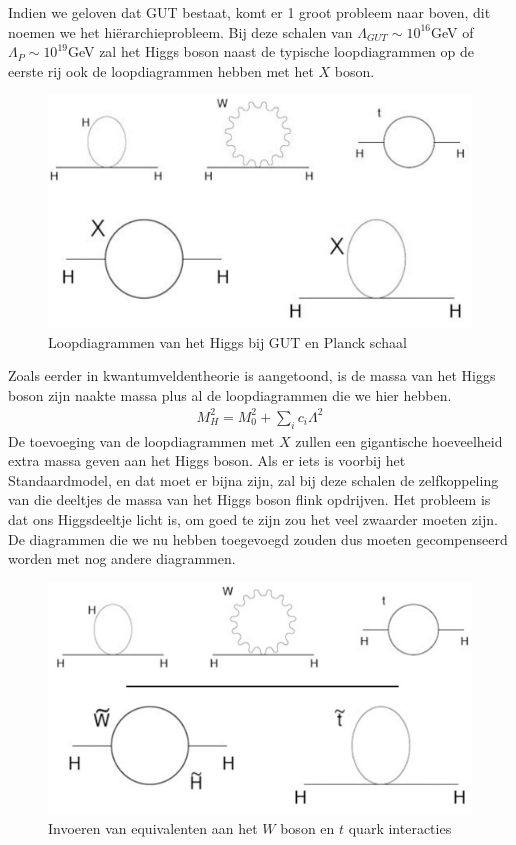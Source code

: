 \documentclass[../main.tex]{subfiles}
\begin{document}
Indien we geloven dat GUT bestaat, komt er 1 groot probleem naar boven, dit noemen we het hiërarchieprobleem. Bij deze schalen van $\Lambda_{G U T} \sim 10^{16}$GeV of $\Lambda_{P} \sim 10^{19}$GeV zal het Higgs boson naast de typische loopdiagrammen op de eerste rij ook de loopdiagrammen hebben met het $X$ boson.

\begin{figure}[h]
    \centering
    \includegraphics[width=0.5\linewidth]{physics_beyond_the_standard_model/loop_diagrammen_higgs.png}
    \caption{Loopdiagrammen van het Higgs bij GUT en Planck schaal}%
    \label{fig:physics_beyond_the_standard_model/loop_diagrammen_higgs}
\end{figure}

Zoals eerder in kwantumveldentheorie is aangetoond, is de massa van het Higgs boson zijn naakte massa plus al de loopdiagrammen die we hier hebben.
\begin{equation}
    \begin{aligned}
        \label{eq:massa_higgs}
        M_{H}^{2}=M_{0}^{2}+\sum_{i} c_{i} \Lambda^{2}
    \end{aligned}
\end{equation}
De toevoeging van de loopdiagrammen met $X$ zullen een gigantische hoeveelheid extra massa geven aan het Higgs boson. Als er iets is voorbij het Standaardmodel, en dat moet er bijna zijn, zal bij deze schalen de zelfkoppeling van die deeltjes de massa van het Higgs boson flink opdrijven. Het probleem is dat ons Higgsdeeltje licht is, om goed te zijn zou het veel zwaarder moeten zijn. De diagrammen die we nu hebben toegevoegd zouden dus moeten gecompenseerd worden met nog andere diagrammen.

\begin{figure}[h]
    \centering
    \includegraphics[width=0.5\linewidth]{physics_beyond_the_standard_model/sussy_deeltjes.png}
    \caption{Invoeren van equivalenten aan het $W$ boson en $t$ quark interacties}%
    \label{fig:physics_beyond_the_standard_model/sussy_deeltjes}
\end{figure}
\end{document}
